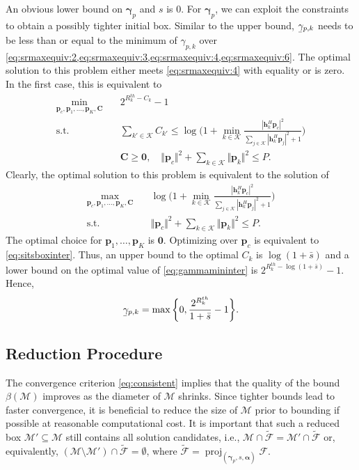 \documentclass[a4paper,10pt,journal]{IEEEtran}
\DeclareMathOperator\proj{proj}
\let\vec\bm
\newcommand{\ubar}[1]{\underaccent{\bar}{#1}}
\begin{document}
An obvious lower bound on $\vec\gamma_p$ and $s$ is 0. For $\vec\gamma_p$, we can exploit the  constraints to obtain a possibly tighter initial box. Similar to the upper bound, $\ubar{\gamma}_{p,k}$ needs to be less than or equal to the minimum of $\gamma_{p,k}$ over \cref{eq:srmaxequiv:2,eq:srmaxequiv:3,eq:srmaxequiv:4,eq:srmaxequiv:6}. The optimal solution to this problem either meets \cref{eq:srmaxequiv:4} with equality or is zero. In the first case, this is equivalent to
\begin{subequations} \label{eq:gammamininter}
	\begin{align}
		\min_{\vec p_c, \vec p_1, \dots, \vec p_K, \vec C}\quad & 2^{R_k^{th} - C_k} - 1 \\
	\mbox{s.t.}\quad
	& \sum_{k'\in \mathcal{K}}C_{k'}\leq \log\bigg(1+ \min_{k\in\mathcal K}\frac{|{\vec{h}}_{k}^{H}\vec{p}_{c}|^2}{\sum\limits_{j\in\mathcal{K}}|\vec{h}_{k}^{H}\vec{p}_{j}|^2+1}\bigg) \\
	& \vec C\geq \vec{0},\quad
	\Vert \vec p_c \Vert^2 + \sum_{k\in\mathcal K} \Vert \vec p_k \Vert^2 \le P.
	\end{align}
\end{subequations}
Clearly, the optimal solution to this problem is equivalent to the solution of
\begin{subequations}
	\begin{align}
	\max_{\vec p_c, \vec p_1, \dots, \vec p_K, \vec C}\quad & \log\bigg(1+ \min_{k\in\mathcal K}\frac{|{\vec{h}}_{k}^{H}\vec{p}_{c}|^2}{\sum\limits_{j\in\mathcal{K}}|\vec{h}_{k}^{H}\vec{p}_{j}|^2+1}\bigg) \\
	\mbox{s.t.}\quad
	& \Vert \vec p_c \Vert^2 + \sum_{k\in\mathcal K} \Vert \vec p_k \Vert^2 \le P.
	\end{align}
\end{subequations}
The optimal choice for $\vec p_1, \dots, \vec p_K$ is $\vec 0$. Optimizing over $\vec p_c$ is equivalent to \cref{eq:sitsboxinter}. Thus, an upper bound to the optimal $C_k$ is $\log(1+\bar{s})$ and a lower bound on the optimal value of \cref{eq:gammamininter} is $2^{R_k^{th} - \log(1+\bar{s})} - 1$. Hence,
\begin{equation}
\ubar{\gamma}_{p,k} = \max\bigg\{ 0, \frac{2^{R_k^{th}}}{ 1 + \bar{s}} - 1 \bigg\}.
\end{equation}

\subsection{Reduction Procedure} \label{sec:sit:red}
The convergence criterion \cref{eq:consistent} implies that the quality of the bound $\beta(\mathcal M)$ improves as the diameter of $\mathcal M$ shrinks. Since tighter bounds lead to faster convergence, it is beneficial to reduce the size of $\mathcal M$ prior to bounding if possible at reasonable computational cost. It is important that such a reduced box $\mathcal M' \subseteq \mathcal M$ still contains all solution candidates, i.e., $\mathcal M \cap \tilde{\mathcal F} = \mathcal M' \cap \tilde{\mathcal F}$ or, equivalently,
$(\mathcal M\setminus\mathcal M') \cap \tilde{\mathcal F} = \emptyset$, where $\tilde{\mathcal F} = \proj_{(\vec\gamma_p, s, \vec\alpha)} \mathcal F$.
\end{document}
